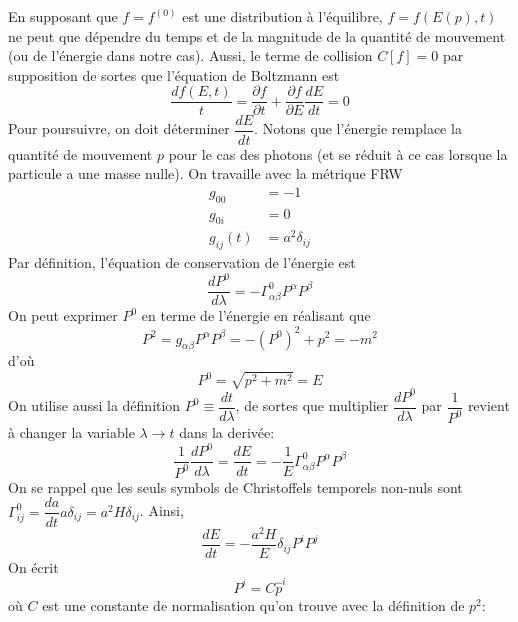 \documentclass{article}
\numberwithin{equation}{section}
\newcommand{\hatp}{\hat{p}}
\begin{document}
En supposant que $f= f^{(0)}$ est une distribution à l'équilibre, $f=f(E(p), t)$ ne 
peut que dépendre du temps et de la magnitude de la quantité de mouvement (ou de l'énergie dans notre cas). 
Aussi, 
le terme de collision $C[f] = 0$ par supposition de sortes que l'équation de Boltzmann est
\begin{equation}\label{eq:Boltzmann} 
        \frac{df(E, t)}{t} = 
        \frac{\partial f}{\partial t}
        + \frac{\partial f}{\partial E} \frac{d E}{d t} 
        =0
\end{equation} 
Pour poursuivre, on doit déterminer $\dfrac{dE}{dt}$. Notons que l'énergie remplace 
la quantité de mouvement $p$ pour le cas des photons (et se réduit à ce cas lorsque 
la particule a une masse nulle).
On travaille avec la métrique FRW
\begin{align*}
        g_{00} &=  -1 \\%
        g_{0i} &= 0 \\
        g_{ij}(t) &=  a^2 \delta_{ij}%
\end{align*}
Par définition, l'équation de conservation de l'énergie est
\[
        \frac{d P^{0}}{d \lambda} = -\Gamma^{0}_{\alpha \beta} P^{\alpha}P^{\beta} 
\]
On peut exprimer $P^{0}$ en terme de l'énergie en réalisant que 
\[
        P^2 = g_{\alpha \beta}P^{\alpha} P^{\beta} = -(P^{0})^2 + p^2 = -m^2
\]
d'où
\[
        P^{0} = \sqrt{p^2 + m^2} = E
\]
On utilise aussi la définition $P^{0} \equiv \dfrac{dt}{d\lambda}$, de sortes que 
multiplier $\dfrac{dP^{0}}{d\lambda}$ par $\dfrac{1}{P^{0}}$ revient à 
changer la variable $\lambda \rightarrow t$ dans la derivée:
\[
        \frac{1}{P^{0}}\frac{d P^{0}}{d \lambda} =
        \frac{dE}{dt} = 
        -\frac{1}{E}\Gamma^{0}_{\alpha \beta}P^{\alpha}P^{\beta}
\]
On se rappel que les seuls symbols de Christoffels temporels non-nuls sont 
$\Gamma^{0}_{ij} = \dfrac{da}{dt}a \delta _{ij} = a^2H \delta_{ij}$. Ainsi,
\[
        \frac{d E}{d t} = -\frac{a^2H}{E} \delta_{ij} P^{i}P^{j} 
\]
On écrit
\[
        P^{i} = C \hatp^{i}
\]
où $C$ est une constante de normalisation qu'on trouve avec la définition de $p^2$:
\end{document}

